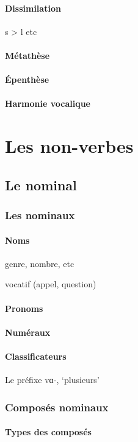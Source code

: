 \documentclass[11pt, a4paper]{book}              %
\newcommand{\ipa}[1]{{\phon \mbox{#1}}} %
\begin{document}
\subsection{Dissimilation}

\ipa{s} > \ipa{l} etc

\subsection{Métathèse}
\subsection{Épenthèse}
\subsection{Harmonie vocalique}



\part{Les non-verbes}
\chapter{Le nominal}
\section{Les nominaux}
\subsection{Noms}
genre, nombre, etc

vocatif (appel, question)
\subsection{Pronoms}
\subsection{Numéraux}
\subsection{Classificateurs}

Le préfixe \ipa{vɑ-}, `plusieurs'

\section{Composés nominaux}
\subsection{Types des composés}
\end{document}
